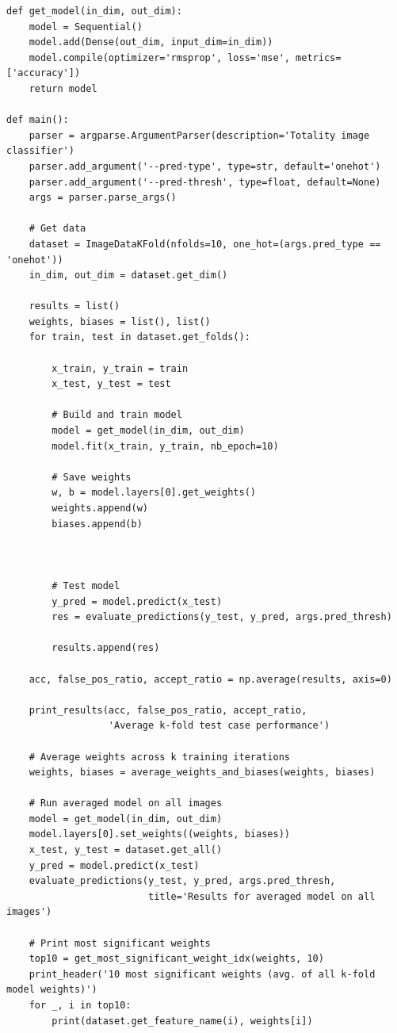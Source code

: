 \documentclass[10pt, onecolumn, draftclsnofoot, letterpaper, compsoc]{IEEEtran}
\begin{document}
\begin{verbatim}
def get_model(in_dim, out_dim):
    model = Sequential()
    model.add(Dense(out_dim, input_dim=in_dim))
    model.compile(optimizer='rmsprop', loss='mse', metrics=['accuracy'])
    return model

def main():
    parser = argparse.ArgumentParser(description='Totality image classifier')
    parser.add_argument('--pred-type', type=str, default='onehot')
    parser.add_argument('--pred-thresh', type=float, default=None)
    args = parser.parse_args()

    # Get data
    dataset = ImageDataKFold(nfolds=10, one_hot=(args.pred_type == 'onehot'))
    in_dim, out_dim = dataset.get_dim()

    results = list()
    weights, biases = list(), list()
    for train, test in dataset.get_folds():

        x_train, y_train = train
        x_test, y_test = test

        # Build and train model
        model = get_model(in_dim, out_dim)
        model.fit(x_train, y_train, nb_epoch=10)

        # Save weights
        w, b = model.layers[0].get_weights()
        weights.append(w)
        biases.append(b)



        # Test model
        y_pred = model.predict(x_test)
        res = evaluate_predictions(y_test, y_pred, args.pred_thresh)

        results.append(res)

    acc, false_pos_ratio, accept_ratio = np.average(results, axis=0)

    print_results(acc, false_pos_ratio, accept_ratio,
                  'Average k-fold test case performance')

    # Average weights across k training iterations
    weights, biases = average_weights_and_biases(weights, biases)

    # Run averaged model on all images
    model = get_model(in_dim, out_dim)
    model.layers[0].set_weights((weights, biases))
    x_test, y_test = dataset.get_all()
    y_pred = model.predict(x_test)
    evaluate_predictions(y_test, y_pred, args.pred_thresh,
                         title='Results for averaged model on all images')

    # Print most significant weights
    top10 = get_most_significant_weight_idx(weights, 10)
    print_header('10 most significant weights (avg. of all k-fold model weights)')
    for _, i in top10:
        print(dataset.get_feature_name(i), weights[i])
\end{verbatim}
\end{document}
